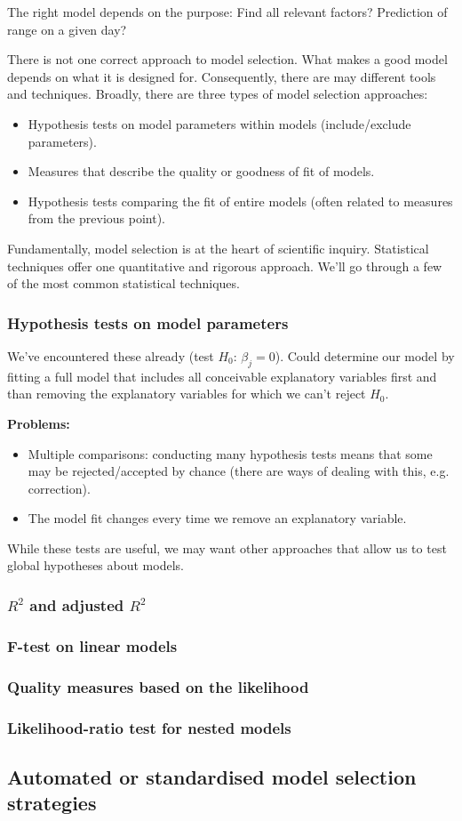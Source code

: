 The right model depends on the purpose: Find all relevant factors? Prediction of range on a given day?

There is not one correct approach to model selection. What makes a good model depends on what it is designed for. Consequently, there are may different tools and techniques. Broadly, there are three types of model selection approaches:
\begin{itemize}
	\item Hypothesis tests on model parameters within models (include/exclude parameters).
	\item Measures that describe the quality or goodness of fit of models.
	\item Hypothesis tests comparing the fit of entire models (often related to measures from the previous point).
\end{itemize}
Fundamentally, model selection is at the heart of scientific inquiry. Statistical techniques offer one quantitative and rigorous approach. We'll go through a few of the most common statistical techniques.

\subsubsection{Hypothesis tests on model parameters}

We've encountered these already (test $H_0$: $\beta_j=0$). Could determine our model by fitting a full model that includes all conceivable explanatory variables first and than removing the explanatory variables for which we can't reject $H_0$.

\textbf{Problems:}
\begin{itemize}
	\item Multiple comparisons: conducting many hypothesis tests means that some may be rejected/accepted by chance (there are ways of dealing with this, e.g.  correction).
	\item The model fit changes every time we remove an explanatory variable.
\end{itemize} 

While these tests are useful, we may want other approaches that allow us to test global hypotheses about models.

\subsubsection{$R^2$ and adjusted $R^2$}

\subsubsection{F-test on linear models}

\subsubsection{Quality measures based on the likelihood}

\subsubsection{Likelihood-ratio test for nested models}

\subsection{Automated or standardised model selection strategies}